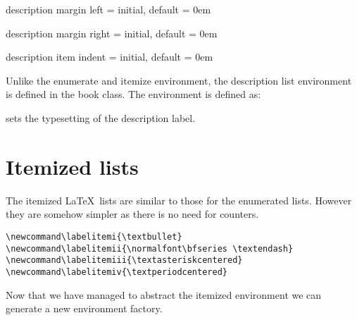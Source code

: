 \begin{docKey} {description margin left} { =  } {initial, default = 0em}
\end{docKey}

\begin{docKey} {description margin right} { =  } {initial, default = 0em}
\end{docKey}

\begin{docKey} {description item indent} { =  } {initial, default = 0em}
\end{docKey}

Unlike the enumerate and itemize environment, the description list environment is defined in the book class.
The environment is defined as:

 sets the typesetting of the description label.
\section{Itemized lists}

The itemized \LaTeX\ lists are similar to those for the enumerated lists. However they are somehow simpler as there is no need for counters.

\bigskip
\begin{tcolorbox}[width=\linewidth,arc=2mm,title=Default \LaTeX\ parameters for itemized lists]
\begin{lstlisting}
\newcommand\labelitemi{\textbullet}
\newcommand\labelitemii{\normalfont\bfseries \textendash}
\newcommand\labelitemiii{\textasteriskcentered}
\newcommand\labelitemiv{\textperiodcentered}
\end{lstlisting}
\end{tcolorbox}





Now that we have managed to abstract the itemized environment we can generate a new environment factory.

\makeatletter
\def\newitemizedenvironment#1#2{
\@itemdepth=0
\expandafter\def\csname#1\endcsname{%
 \cxset{#2}%
 \ifnum \@itemdepth >\thr@@\@toodeep\else
 \advance\@itemdepth\@ne
 \edef\@itemitem{labelitem\romannumeral\the\@itemdepth}%
 \expandafter
 \list
 \csname\@itemitem\endcsname
 {\def\makelabel####1{\hss\llap{####1}}}%
 \fi}
 \expandafter\let\csname end#1\endcsname=\endlist
}
\makeatother

